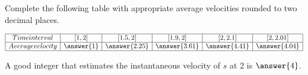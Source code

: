 \documentclass{ximera}
\begin{document}
\begin{exercise}
\begin{exercise}
\begin{exercise}
\begin{exercise}
Complete the following table with appropriate average velocities rounded to two decimal places.

\[
\begin{array}{|c|c|c|c|c|c|}
\hline
Time interval & \left[1,2\right] & \left[1.5,2\right] & \left[1.9,2\right] & \left[2,2.1\right] & \left[2,2.01\right]\\\hline
Average velocity & \answer{1} & \answer{2.25} & \answer{3.61} & \answer{4.41} & \answer{4.04} \\\hline
\end{array}
\]

A good integer that estimates the instantaneous velocity of $s$ at 2 is $\answer{4}$.

\end{exercise}
\end{exercise}
\end{exercise}
\end{exercise}
\end{document}
